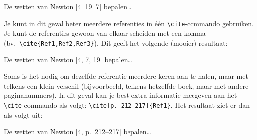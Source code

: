 \documentclass[a4paper]{article}
\begin{document}
\begin{displayquote}
{\color{red} De wetten van Newton [4][19][7] bepalen\ldots}
\end{displayquote}

Je kunt in dit geval beter meerdere referenties in \'e\'en \texttt{\textbackslash{}cite}-commando gebruiken.
Je kunt de referenties gewoon van elkaar scheiden met een komma (bv.\ \texttt{\textbackslash{}cite\{Ref1,Ref2,Ref3\}}).
Dit geeft het volgende (mooier) resultaat:

\begin{displayquote}
{\color{darkgreen} De wetten van Newton [4, 7, 19] bepalen\ldots}
\end{displayquote}

Soms is het nodig om dezelfde referentie meerdere keren aan te halen, maar met telkens een klein verschil (bijvoorbeeld, telkens hetzelfde boek, maar met andere paginanummers).
In dit geval kan je best extra informatie meegeven aan het \texttt{\textbackslash{}cite}-commando als volgt: \texttt{\textbackslash{}cite[p.~212-217]\{Ref1\}}.
Het resultaat ziet er dan als volgt uit:

\begin{displayquote}
{\color{darkgreen} De wetten van Newton [4, p.~212--217] bepalen\ldots}
\end{displayquote}



\end{document}
